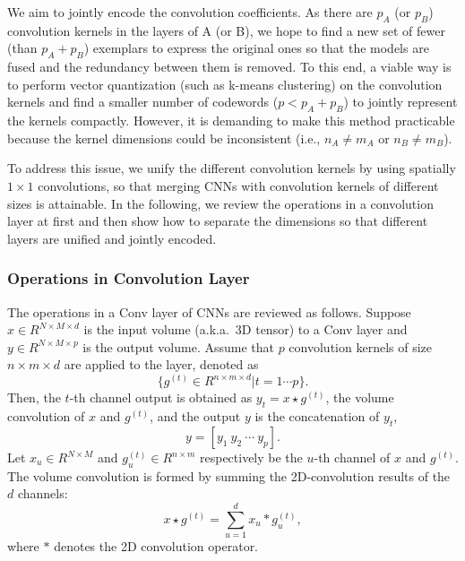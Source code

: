 \documentclass{article}
\begin{document}
	We aim to jointly encode the convolution coefficients.
	As there are $p_A$ (or $p_B$) convolution kernels in the layers of A (or B), we hope to find a new set of fewer (than $p_A+p_B$) exemplars to express the original ones so that the models are fused and the redundancy between them is removed.
	To this end, a viable way is to perform vector quantization (such as k-means clustering) on the convolution kernels and find a smaller number of codewords ($p<p_A+p_B$) to jointly represent the kernels compactly.
	However, it is demanding to make this method practicable because the kernel dimensions could be inconsistent (i.e., $n_A \neq m_A$ or $n_B \neq m_B$).
	
	To address this issue, we unify the different convolution kernels by using spatially  $1\times 1$ convolutions,
	so that merging CNNs with convolution kernels of different sizes is attainable.
	In the following, we review the operations in a convolution layer at first and then show how to separate the dimensions so that different layers are unified and jointly encoded.
	
	
	\subsubsection{Operations in Convolution Layer}
	The operations in a Conv layer of CNNs are reviewed as follows.
	Suppose $x\in R^{N\times M \times d}$ is the input volume (a.k.a.~3D tensor) to a Conv layer and $y\in R^{N\times M \times p}$ is the output volume.
	Assume that $p$ convolution kernels of size $n\times m \times d$ are applied to the layer, denoted as
	\begin{equation}
	\label{eq0}
	\{g^{(t)}\in R^{n\times m \times d} | t=1\cdots p\}.
	\end{equation}
	Then, the $t$-th channel output is obtained as $y_t=x \star g^{(t)}$, the volume convolution of $x$ and $g^{(t)}$,
	and the output $y$ is the concatenation of $y_t$,
	\begin{equation}
	\label{eq1.1}
	y =[y_{1}~y_{2}~\cdots~y_{p}].
	\end{equation}
	Let $x_u\in R^{N\times M}$ and $g_u^{(t)}\in R^{n\times m}$ respectively be the $u$-th channel of $x$ and $g^{(t)}$.  %
	The volume convolution is formed by summing the 2D-convolution results of the $d$ channels:
	\begin{equation}
	\label{eq1.5}
	x\star g^{(t)}=\sum_{u=1}^{d} x_u\ast g_u^{(t)},
	\end{equation}
	where $\ast$ denotes the 2D convolution operator.
	
\end{document}

